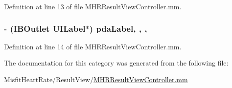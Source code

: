 Definition at line 13 of file M\+H\+R\+Result\+View\+Controller.\+mm.

\hypertarget{category_m_h_r_result_view_controller_07_08_a4d91971b1a4e42c64a1c0d2790b1fe53}{
\subsubsection[{pda\+Label}]{\setlength{\rightskip}{0pt plus 5cm}-\/ (I\+B\+Outlet U\+I\+Label$\ast$) pda\+Label\hspace{0.3cm}{\ttfamily [read]}, {\ttfamily [write]}, {\ttfamily [nonatomic]}, {\ttfamily [weak]}}}\label{category_m_h_r_result_view_controller_07_08_a4d91971b1a4e42c64a1c0d2790b1fe53}


Definition at line 14 of file M\+H\+R\+Result\+View\+Controller.\+mm.



The documentation for this category was generated from the following file\+:\begin{DoxyCompactItemize}
\item 
Misfit\+Heart\+Rate/\+Result\+View/\hyperlink{_m_h_r_result_view_controller_8mm}{M\+H\+R\+Result\+View\+Controller.\+mm}\end{DoxyCompactItemize}
